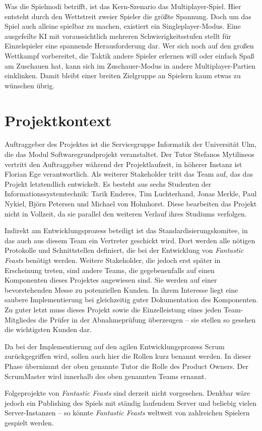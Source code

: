 Was die Spielmodi betrifft, ist das Kern-Szenario das Multiplayer-Spiel. Hier entsteht durch den Wettstreit zweier Spieler die größte Spannung. Doch um das Spiel auch alleine spielbar zu machen, existiert ein Singleplayer-Modus. Eine ausgefeilte KI mit voraussichtlich mehreren Schwierigkeitsstufen stellt für Einzelspieler eine spannende Herausforderung dar. Wer sich noch auf den großen Wettkampf vorbereitet, die Taktik andere Spieler erlernen will oder einfach Spaß am Zuschauen hat, kann sich im Zuschauer-Modus in andere Multiplayer-Partien einklinken. Damit bleibt einer breiten Zielgruppe an Spielern kaum etwas zu wünschen übrig.

\section{Projektkontext}
Auftraggeber des Projektes ist die Servicegruppe Informatik der Universität Ulm, die das Modul Softwaregrundprojekt veranstaltet. Der Tutor Stefanos Mytilineos vertritt den Auftraggeber während der Projektlaufzeit, in höherer Instanz ist Florian Ege verantwortlich. Als weiterer Stakeholder tritt das Team auf, das das Projekt letztendlich entwickelt. Es besteht aus sechs Studenten der Informationssystemtechnik: Tarik Enderes, Tim Luchterhand, Jonas Merkle, Paul Nykiel, Björn Petersen und Michael von Hohnhorst. Diese bearbeiten das Projekt nicht in Vollzeit, da sie parallel den weiteren Verlauf ihres Studiums verfolgen. 

Indirekt am Entwicklungsprozess beteiligt ist das Standardisierungskomitee, in das auch aus diesem Team ein Vertreter geschickt wird. Dort werden alle nötigen Protokolle und Schnittstellen definiert, die bei der Entwicklung von \textit{Fantastic Feasts} benötigt werden. Weitere Stakeholder, die jedoch erst später in Erscheinung treten, sind andere Teams, die gegebenenfalls auf einen Komponenten dieses Projektes angewiesen sind. Sie werden auf einer bevorstehenden Messe zu potenziellen Kunden. In ihrem Interesse liegt eine saubere Implementierung bei gleichzeitig guter Dokumentation des Komponenten. Zu guter letzt muss dieses Projekt sowie die Einzelleistung eines jeden Team-Mitgliedes die Prüfer in der Abnahmeprüfung überzeugen – sie stellen so gesehen die wichtigsten Kunden dar.

Da bei der Implementierung auf den agilen Entwicklungsprozess Scrum zurückgegriffen wird, sollen auch hier die Rollen kurz benannt werden. In dieser Phase übernimmt der oben genannte Tutor die Rolle des Product Owners. Der ScrumMaster wird innerhalb des oben genannten Teams ernannt.

Folgeprojekte von \textit{Fantastic Feasts} sind derzeit nicht vorgesehen. Denkbar wäre jedoch ein Publishing des Spiels mit ständig laufendem Server und beliebig vielen Server-Instanzen – so könnte \textit{Fantastic Feasts} weltweit von zahlreichen Spielern gespielt werden.